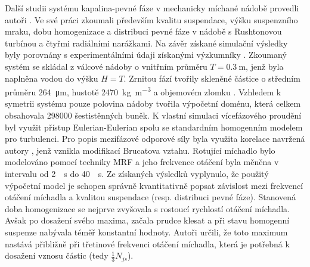 Další studii systému kapalina-pevné fáze v mechanicky míchané nádobě provedli autoři \citet{kas08}. Ve své práci zkoumali především kvalitu suspendace, výšku suspenzního mraku, dobu homogenizace a distribuci pevné fáze v nádobě s Rushtonovou turbínou a čtyřmi radiálními narážkami. Na závěr získané simulační výsledky byly porovnány s experimentálními údaji získanými výzkumníky \citet{yama08}. Zkoumaný systém se skládal z válcové nádoby o vnitřním průměru $T=\SI{0.3}{\meter}$, jenž byla naplněna vodou do výšku $H=T$. Zrnitou fází tvořily skleněné částice o středním průměru \SI{264}{\micro\meter}, hustotě \SI{2470}{\kilogram\per\cubic\meter} a objemovém zlomku . Vzhledem k symetrii systému pouze polovina nádoby tvořila výpočetní doménu, která celkem obsahovala \num{298000} šestistěnných buněk. K vlastní simulaci vícefázového proudění byl využit přístup Eulerian-Eulerian spolu se standardním homogenním \keps{} modelem pro turbulenci. Pro popis mezifázové odporové síly byla využita korelace navržená autory \citet{kho06}, jenž vznikla modifikací Brucatova vztahu. Rotující míchadlo bylo modelováno pomocí techniky MRF a jeho frekvence otáčení byla měněna v intervalu od \SI{2}{\per\second} do \SI{40}{\per\second}. Ze získaných výsledků vyplynulo, že použitý výpočetní model je schopen správně kvantitativně popsat závislost mezi frekvencí otáčení míchadla a kvalitou suspendace (resp. distribuci pevné fáze). Stanovená doba homogenizace se nejprve zvyšovala s rostoucí rychlostí otáčení míchadla. Avšak po dosažení svého maxima, začala prudce klesat a při stavu homogenní suspenze nabývala téměř konstantní hodnoty. Autoři určili, že toto maximum nastává přibližně při třetinové frekvenci otáčení míchadla, která je potřebná k dosažení vznosu částic (tedy $\frac{1}{3}N_{js}$).


